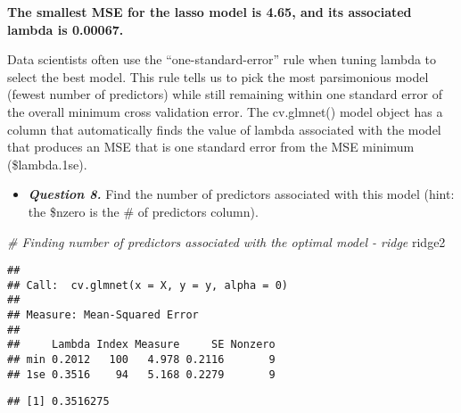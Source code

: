 \documentclass[
]{article}
\newenvironment{Shaded}{\begin{snugshade}}{\end{snugshade}}
\newcommand{\CommentTok}[1]{\textcolor[rgb]{0.56,0.35,0.01}{\textit{#1}}}
\newcommand{\DecValTok}[1]{\textcolor[rgb]{0.00,0.00,0.81}{#1}}
\newcommand{\FloatTok}[1]{\textcolor[rgb]{0.00,0.00,0.81}{#1}}
\newcommand{\NormalTok}[1]{#1}
\newcommand{\SpecialCharTok}[1]{\textcolor[rgb]{0.00,0.00,0.00}{#1}}
\providecommand{\tightlist}{%
  \setlength{\itemsep}{0pt}\setlength{\parskip}{0pt}}
\begin{document}
\textbf{The smallest MSE for the lasso model is 4.65, and its associated
lambda is 0.00067.}

Data scientists often use the ``one-standard-error'' rule when tuning
lambda to select the best model. This rule tells us to pick the most
parsimonious model (fewest number of predictors) while still remaining
within one standard error of the overall minimum cross validation error.
The cv.glmnet() model object has a column that automatically finds the
value of lambda associated with the model that produces an MSE that is
one standard error from the MSE minimum (\$lambda.1se).

\begin{itemize}
\tightlist
\item
  \textbf{\emph{Question 8.}} Find the number of predictors associated
  with this model (hint: the \$nzero is the \# of predictors column).
\end{itemize}

\begin{Shaded}
\begin{Highlighting}[]
\CommentTok{\# Finding number of predictors associated with the optimal model {-} ridge}
\NormalTok{ridge2}
\end{Highlighting}
\end{Shaded}

\begin{verbatim}
## 
## Call:  cv.glmnet(x = X, y = y, alpha = 0) 
## 
## Measure: Mean-Squared Error 
## 
##     Lambda Index Measure     SE Nonzero
## min 0.2012   100   4.978 0.2116       9
## 1se 0.3516    94   5.168 0.2279       9
\end{verbatim}

\begin{Shaded}
\end{Shaded}

\begin{verbatim}
## [1] 0.3516275
\end{verbatim}

\begin{Shaded}
\end{Shaded}
\end{document}
